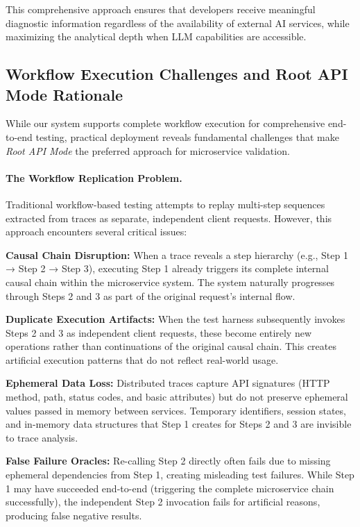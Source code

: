 \documentclass[conference]{IEEEtran}
\begin{document}
This comprehensive approach ensures that developers receive meaningful diagnostic information regardless of the availability of external AI services, while maximizing the analytical depth when LLM capabilities are accessible.

\subsection{Workflow Execution Challenges and Root API Mode Rationale}\label{ssec:workflow-challenges}

While our system supports complete workflow execution for comprehensive end-to-end testing, practical deployment reveals fundamental challenges that make \emph{Root API Mode} the preferred approach for microservice validation.

\paragraph{The Workflow Replication Problem.}
Traditional workflow-based testing attempts to replay multi-step sequences extracted from traces as separate, independent client requests. However, this approach encounters several critical issues:

\textbf{Causal Chain Disruption:} When a trace reveals a step hierarchy (e.g., Step 1 → Step 2 → Step 3), executing Step 1 already triggers its complete internal causal chain within the microservice system. The system naturally progresses through Steps 2 and 3 as part of the original request's internal flow.

\textbf{Duplicate Execution Artifacts:} When the test harness subsequently invokes Steps 2 and 3 as independent client requests, these become entirely new operations rather than continuations of the original causal chain. This creates artificial execution patterns that do not reflect real-world usage.

\textbf{Ephemeral Data Loss:} Distributed traces capture API signatures (HTTP method, path, status codes, and basic attributes) but do not preserve ephemeral values passed in memory between services. Temporary identifiers, session states, and in-memory data structures that Step 1 creates for Steps 2 and 3 are invisible to trace analysis.

\textbf{False Failure Oracles:} Re-calling Step 2 directly often fails due to missing ephemeral dependencies from Step 1, creating misleading test failures. While Step 1 may have succeeded end-to-end (triggering the complete microservice chain successfully), the independent Step 2 invocation fails for artificial reasons, producing false negative results.
\end{document}

